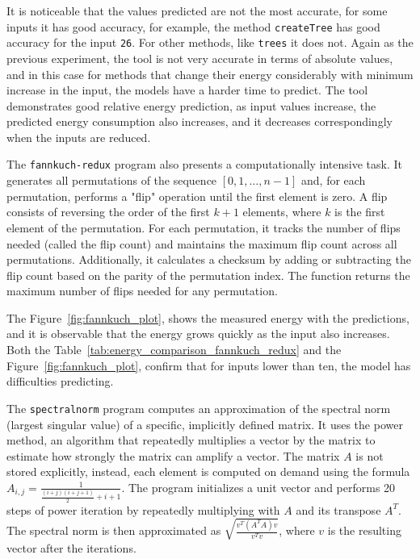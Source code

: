 It is noticeable that the values predicted are not the most accurate, for some inputs it has good accuracy, for example, the method \texttt{createTree} has good accuracy for the input \texttt{26}. For other methods, like \texttt{trees} it does not. Again as the previous experiment, the tool is not very accurate in terms of absolute values, and in this case for methods that change their energy considerably with minimum increase in the input, the models have a harder time to predict. The tool demonstrates good relative energy prediction, as input values increase, the predicted energy consumption also increases, and it decreases correspondingly when the inputs are reduced.


The \texttt{fannkuch-redux} program also presents a computationally intensive task. It generates all permutations of the sequence \([0, 1, \ldots, n-1]\) and, for each permutation, performs a "flip" operation until the first element is zero. A flip consists of reversing the order of the first \(k + 1\) elements, where \(k\) is the first element of the permutation. For each permutation, it tracks the number of flips needed (called the flip count) and maintains the maximum flip count across all permutations. Additionally, it calculates a checksum by adding or subtracting the flip count based on the parity of the permutation index. The function returns the maximum number of flips needed for any permutation.

The Figure~\ref{fig:fannkuch_plot}, shows the measured energy with the predictions, and it is observable that the energy grows quickly as the input also increases. Both the Table~\ref{tab:energy_comparison_fannkuch_redux} and the Figure~\ref{fig:fannkuch_plot}, confirm that for inputs lower than ten, the model has difficulties predicting.

The \texttt{spectralnorm} program computes an approximation of the spectral norm (largest singular value) of a specific, implicitly defined matrix. It uses the power method, an algorithm that repeatedly multiplies a vector by the matrix to estimate how strongly the matrix can amplify a vector. The matrix \(A\) is not stored explicitly, instead, each element is computed on demand using the formula \(A_{i,j} = \frac{1}{\frac{(i + j)(i + j + 1)}{2} + i + 1}\). The program initializes a unit vector and performs 20 steps of power iteration by repeatedly multiplying with \(A\) and its transpose \(A^T\). The spectral norm is then approximated as \(\sqrt{\frac{v^T (A^T A) v}{v^T v}}\), where \(v\) is the resulting vector after the iterations.

